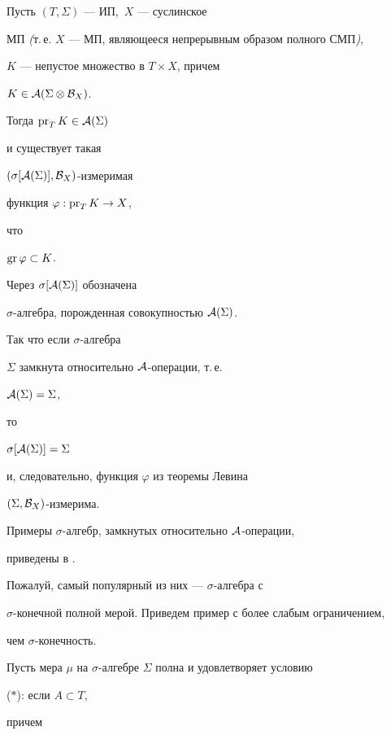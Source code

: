 \begin{thmlev} Пусть $(T,\Sigma)$ --- ИП,\, $X$ --- суслинское


МП {\em (}т.\,е. $X$ --- МП, являющееся непрерывным образом полного СМП{\em )},


$K$ --- непустое множество в $T\times X$, причем


$K\in{\cal A}(\Sigma\otimes{\cal B}_X)$.


Тогда $\operatorname{pr}_T K\in{\cal A}(\Sigma)$


и существует такая


$(\sigma[{\cal A}(\Sigma)],{\cal B}_X)$-измеримая


функция $\varphi:\operatorname{pr}_T K\to X$,


что


$\operatorname{gr}\varphi\subset K$.


\end{thmlev}





Через $\sigma[{\cal A}(\Sigma)]$ обозначена


$\sigma$-алгебра, порожденная совокупностью ${\cal A}(\Sigma)$.


Так что если $\sigma$-алгебра


$\Sigma$ замкнута относительно ${\cal A}$-операции, т.\,е.


${\cal A}(\Sigma)=\Sigma$,


то


$\sigma[{\cal A}(\Sigma)]=\Sigma$


и, следовательно, функция $\varphi$ из теоремы Левина


$(\Sigma,{\cal B}_X)$-измерима.





Примеры $\sigma$-алгебр, замкнутых относительно ${\cal A}$-операции,


приведены в \cite{Lev1}.


Пожалуй, самый популярный из них --- $\sigma$-алгебра с


$\sigma$-конечной полной мерой. Приведем пример с более слабым ограничением,


чем $\sigma$-конечность.





Пусть мера $\mu$ на $\sigma$-алгебре $\Sigma$ полна и удовлетворяет условию


($\ast$): если $A\subset T$,


причем


